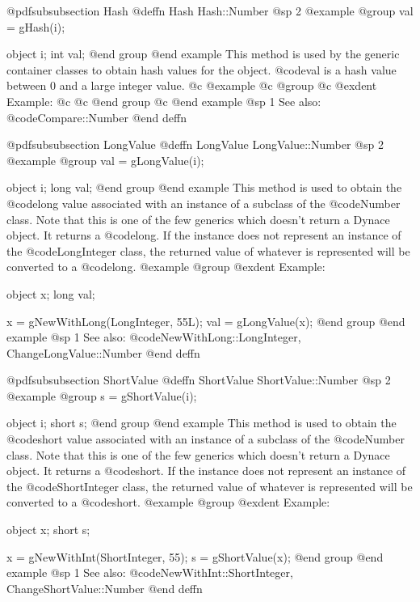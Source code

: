 @pdfsubsubsection {Hash}
@deffn {Hash} Hash::Number
@sp 2
@example
@group
val = gHash(i);

object  i;
int     val;
@end group
@end example
This method is used by the generic container classes to obtain hash values
for the object.  @code{val} is a hash value between 0 and a large integer
value.
@c @example
@c @group
@c @exdent Example:
@c
@c @end group
@c @end example
@sp 1
See also:  @code{Compare::Number}
@end deffn











@pdfsubsubsection {LongValue}
@deffn {LongValue} LongValue::Number
@sp 2
@example
@group
val = gLongValue(i);

object  i;
long    val;
@end group
@end example
This method is used to obtain the @code{long} value associated
with an instance of a subclass of the @code{Number} class.  Note that
this is one of the few generics which doesn't return a Dynace object.
It returns a @code{long}.  If the instance does not represent
an instance of the @code{LongInteger} class, the returned value
of whatever is represented will be converted to a @code{long}.
@example
@group
@exdent Example:

object  x;
long    val;

x = gNewWithLong(LongInteger, 55L);
val = gLongValue(x);
@end group
@end example
@sp 1
See also:  @code{NewWithLong::LongInteger, ChangeLongValue::Number}
@end deffn










@pdfsubsubsection {ShortValue}
@deffn {ShortValue} ShortValue::Number
@sp 2
@example
@group
s = gShortValue(i);

object  i;
short   s;
@end group
@end example
This method is used to obtain the @code{short} value associated with an
instance of a subclass of the @code{Number} class.  Note that this is
one of the few generics which doesn't return a Dynace object.  It
returns a @code{short}.  If the instance does not represent an instance
of the @code{ShortInteger} class, the returned value of whatever is
represented will be converted to a @code{short}.
@example
@group
@exdent Example:

object  x;
short   s;

x = gNewWithInt(ShortInteger, 55);
s = gShortValue(x);
@end group
@end example
@sp 1
See also:  @code{NewWithInt::ShortInteger, ChangeShortValue::Number}
@end deffn












